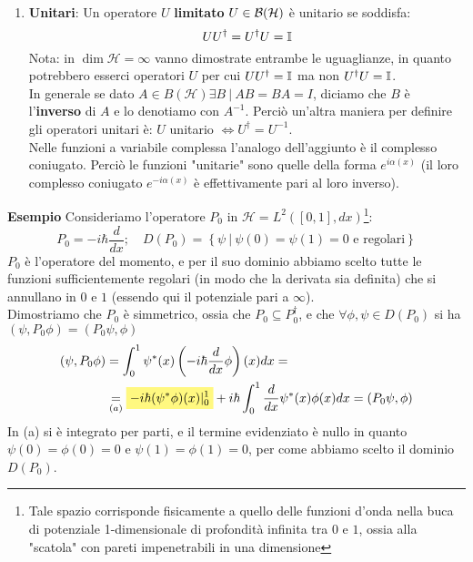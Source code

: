 \begin{enumerate}
	\item \textbf{Unitari}: Un operatore $U$ \textbf{limitato} $U\in \mathcal{B}(\mathcal{H})$ è unitario se soddisfa:
	\begin{equation}
	UU^\dag=U^\dag U=\mathbb{I}
	\label{eqn:unitario}
	\end{equation}
	Nota: in $\dim{\mathcal{H}=\infty}$ vanno dimostrate entrambe le uguaglianze, in quanto potrebbero esserci operatori $U$ per cui $U U^\dag = \mathbb{I}$ ma non $U^\dag U = \mathbb{I}$.\\
	In generale se dato $A\in B\left(\mathcal{H}\right) \exists B\>|\> AB=BA=I$, diciamo che $B$ è l'\textbf{inverso} di $A$ e lo denotiamo con $A^{-1}$. Perciò un'altra maniera per definire gli operatori unitari è: $U$ unitario $\Leftrightarrow U^\dag=U^{-1}$.\\
	Nelle funzioni a variabile complessa l'analogo dell'aggiunto è il complesso coniugato. Perciò le funzioni "unitarie" sono quelle della forma $e^{i\alpha\left(x\right)}$ (il loro complesso coniugato $e^{-i\alpha(x)}$ è effettivamente pari al loro inverso).
\end{enumerate}
\textbf{Esempio} 
Consideriamo l'operatore $P_0$ in $\mathcal{H}=L^2(\left[0,1\right], dx)$\footnote{Tale spazio corrisponde fisicamente a quello delle funzioni d'onda nella buca di potenziale 1-dimensionale di profondità infinita tra $0$ e $1$, ossia alla "scatola" con pareti impenetrabili in una dimensione}:
\[
P_0=-i\hbar\frac{d}{dx};\quad D\left(P_0\right)=\left\{\psi\>|\> \psi\left(0\right)= \psi\left(1\right)=0\text{  e regolari}\right\}
\]
$P_0$ è l'operatore del momento, e per il suo dominio abbiamo scelto tutte le funzioni sufficientemente regolari (in modo che la derivata sia definita) che si annullano in $0$ e $1$ (essendo qui il potenziale pari a $\infty$).\\
Dimostriamo che $P_0$ è simmetrico, ossia che $P_0\subseteq P_0^\dag$, e che $\forall\phi, \psi\in D\left(P_0\right)$ si ha $\left(\psi, P_0\phi\right)=\left(P_0\psi, \phi\right)$
\begin{align*}
(\psi,P_0\phi) &= \int_0^1 \psi^*(x) \left ( -i\hbar \frac{d}{dx} \phi \right)(x) dx =\\
&\underset{(a)}{=} \hlc{Yellow}{-i\hbar (\psi^*\phi)(x)|_0^1} + i\hbar \int_0^1 \frac{d}{dx}\psi^*(x) \phi(x) dx = (P_0\psi, \phi)
\end{align*}
In (a) si è integrato per parti, e il termine evidenziato è nullo in quanto $\psi\left(0\right)= \phi\left(0\right)=0$ e $\psi\left(1\right)= \phi\left(1\right)=0$, per come abbiamo scelto il dominio $D(P_0)$.\\

